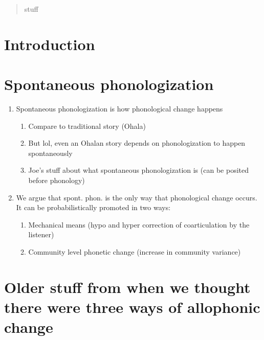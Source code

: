 \date{Received: date / Accepted: date}


\maketitle

\begin{abstract}
stuff
\end{abstract}

\section{Introduction}
\label{intro}


\section{Spontaneous phonologization}
\label{something}

\begin{enumerate}
	\item Spontaneous phonologization is how phonological change happens \begin{enumerate}
		\item Compare to traditional story (Ohala) 
		\item But lol, even an Ohalan story depends on phonologization to happen spontaneously 
		\item Joe's stuff about what spontaneous phonologization is (can be posited before phonology)
		\end{enumerate}
	\item We argue that spont. phon. is the only way that phonological change occurs. It can be probabilistically promoted in two ways: \begin{enumerate}
		\item Mechanical means (hypo and hyper correction of coarticulation by the listener)
		\item Community level phonetic change (increase in community variance) 
		\end{enumerate}
\end{enumerate}



\section{Older stuff from when we thought there were three ways of allophonic change}



